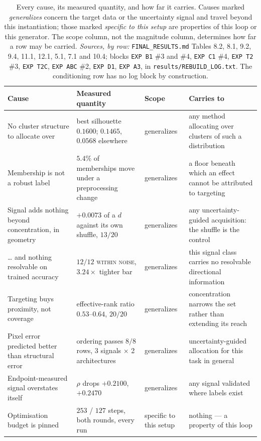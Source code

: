 \documentclass{article} %
\begin{document}
\begin{table}[t]
\caption{Every cause, its measured quantity, and how far it carries. Causes marked
\emph{generalizes} concern the target data or the uncertainty signal and travel beyond this
instantiation; those marked \emph{specific to this setup} are properties of this loop or this
generator. The scope column, not the magnitude column, determines how far a row may be carried. \emph{Sources, by row:} \texttt{FINAL\_RESULTS.md} Tables 8.2, 8.1, 9.2, 9.4, 11.1, 12.1,
5.1, 7.1 and 10.4; blocks \texttt{EXP B1} \#3 and \#4, \texttt{EXP C1} \#4, \texttt{EXP T2} \#3,
\texttt{EXP T2C}, \texttt{EXP ABC} \#2, \texttt{EXP D1}, \texttt{EXP A3}, in
\texttt{results/REBUILD\_LOG.txt}. The conditioning row has no log block by construction.}
\label{tab:causes}
\begin{center}
\small
\begin{tabular}{p{3.0cm}p{3.7cm}p{1.9cm}p{3.3cm}}
\toprule
Cause & Measured quantity & Scope & Carries to \\
\midrule
No cluster structure to allocate over & best silhouette $0.1600$; $0.1465$, $0.0568$ elsewhere & generalizes & any method allocating over clusters of such a distribution \\
Membership is not a robust label & $5.4\%$ of memberships move under a preprocessing change & generalizes & a floor beneath which an effect cannot be attributed to targeting \\
Signal adds nothing beyond concentration, in geometry & $+0.0073$ of a $d$ against its own shuffle, $13/20$ & generalizes & any uncertainty-guided acquisition: the shuffle is the control \\
\ldots{} and nothing resolvable on trained accuracy & $12/12$ \textsc{within noise}, $3.24\times$ tighter bar & generalizes & this signal class carries no resolvable directional information \\
Targeting buys proximity, not coverage & effective-rank ratio $0.53$--$0.64$, $20/20$ & generalizes & concentration narrows the set rather than extending its reach \\
Pixel error predicted better than structural error & ordering passes $8/8$ rows, 3 signals $\times$ 2 architectures & generalizes & uncertainty-guided allocation for this task in general \\
Endpoint-measured signal overstates itself & $\rho$ drops $+0.2100$, $+0.2470$ & generalizes & any signal validated where labels exist \\
\midrule
Optimisation budget is pinned & $253$ / $127$ steps, both rounds, every run & specific to this setup & nothing --- a property of this loop \\

\end{tabular}
\end{center}
\end{table}
\end{document}
